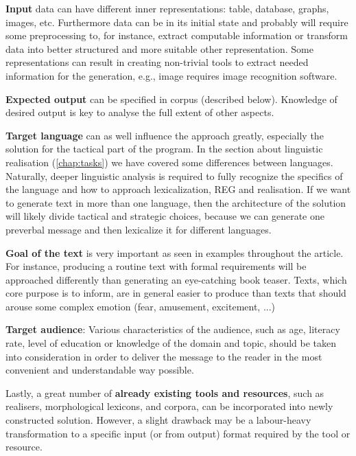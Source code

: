 \textbf{Input} data can have different inner representations: table, database, graphs, images, etc. Furthermore data can be in its initial state and probably will require some preprocessing to, for instance, extract computable information or transform data into better structured and more suitable other representation. Some representations can result in creating non-trivial tools to extract needed information for the generation, e.g., image requires image recognition software.

\textbf{Expected output} can be specified in corpus (described below). Knowledge of desired output is key to analyse the full extent of other aspects.

\textbf{Target language} can as well influence the approach greatly, especially the solution for the tactical part of the program. In the section about linguistic realisation (\autoref{chap:tasks}) we have covered some differences between languages. Naturally, deeper linguistic analysis is required to fully recognize the specifics of the language and how to approach lexicalization, REG and realisation. If we want to generate text in more than one language, then the architecture of the solution will likely divide tactical and strategic choices, because we can generate one preverbal message and then lexicalize it for different languages.

\textbf{Goal of the text} is very important as seen in examples throughout the article. For instance, producing a routine text with formal requirements will be approached differently than generating an eye-catching book teaser. Texts, which core purpose is to inform, are in general easier to produce than texts that should arouse some complex emotion (fear, amusement, excitement, ...)

\textbf{Target audience}: Various characteristics of the audience, such as age, literacy rate, level of education or knowledge of the domain and topic, should be taken into consideration in order to deliver the message to the reader in the most convenient and understandable way possible. 

Lastly, a great number of \textbf{already existing tools and resources}, such as realisers, morphological lexicons, and corpora, can be incorporated into newly constructed solution. However, a slight drawback may be a labour-heavy transformation to a specific input (or from output) format required by the tool or resource.  
 
